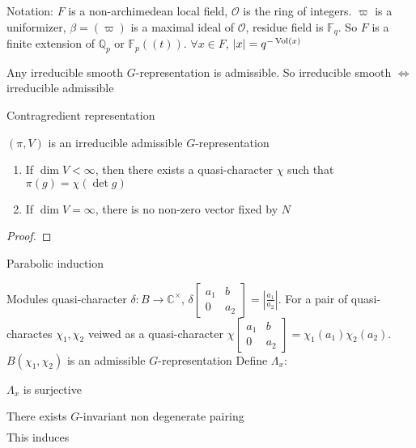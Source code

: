 \documentclass[main]{subfiles}
\begin{document}
Notation: $F$ is a non-archimedean local field, $\mathcal O$ is the ring of integers. $\varpi$ is a uniformizer, $\beta=(\varpi)$ is a maximal ideal of $\mathcal O$, residue field is $\mathbb F_q$. So $F$ is a finite extension of $\mathbb Q_p$ or $\mathbb F_p((t))$. $\forall x\in F$, $|x|=q^{-\operatorname{Vol}(x)}$

\begin{fact}
Any irreducible smooth $G$-representation is admissible. So irreducible smooth $\iff$ irreducible admissible
\end{fact}

\begin{definition}
Contragredient representation
\end{definition}

\begin{lemma}
$(\pi, V)$ is an irreducible admissible $G$-representation
\begin{enumerate}[label=)(\arabic*)]
\item If $\dim V<\infty$, then there exists a quasi-character $\chi$ such that $\pi(g)=\chi(\det g)$
\item If $\dim V=\infty$, there is no non-zero vector fixed by $N$
\end{enumerate}
\end{lemma}

\begin{proof}

\end{proof}

Parabolic induction
\begin{definition}
Modules quasi-character $\delta:B\to\mathbb C^\times$, $\delta\begin{bmatrix}
a_1&b\\
0&a_2
\end{bmatrix}=|\frac{a_1}{a_2}|$. For a pair of quasi-charactes $\chi_1,\chi_2$ veiwed as a quasi-character $\chi\begin{bmatrix}
a_1&b\\
0&a_2
\end{bmatrix}=\chi_1(a_1)\chi_2(a_2)$. $B(\chi_1,\chi_2)$ is an admissible $G$-representation
Define $\Lambda_x:$
\end{definition}

\begin{lemma}
$\Lambda_x$ is surjective
\end{lemma}

\begin{corollary}
There exists $G$-invariant non degenerate pairing
\begin{align*}

\end{align*}
This induces $$
\end{corollary}
\end{document}
